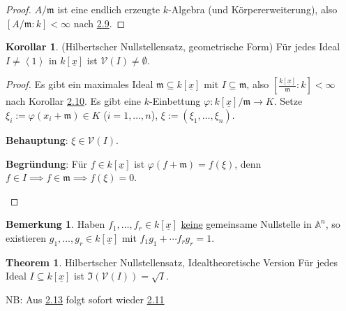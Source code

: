 \documentclass[
twoside=semi,
fontsize=12,
DIV=12, 
cleardoublepage=current,
leqno,
headings=optiontoheadandtoc, 
toc=idx
]{scrbook}
\newcommand{\A}{\mathbb{A}}
\newcommand{\V}{\mathcal{V}}
\newcommand{\x}{\underline{x}}
\newcommand{\I}{\mathfrak{I}}
\newcommand{\bracC}[1]{\left< #1 \right>}
\newcommand{\emphasize}[1]{\underline{#1}}
\theoremstyle{definition}
\newtheorem{bemerkung}[definition]{Bemerkung}
\newtheorem{korollar}[definition]{Korollar}
\newtheorem{theorem}[definition]{Theorem}
\begin{document}
	\begin{proof}\hfill\newline
		$A/\mathfrak{m}$ ist eine endlich erzeugte $k$-Algebra (und K\"orpererweiterung), also $[A/\mathfrak{m}:k] < \infty$ nach \hyperref[1.2.9]{2.9}.
	\end{proof}

	\begin{korollar}\label{1.2.11}(Hilbertscher Nullstellensatz, geometrische Form)\newline
		F\"ur jedes Ideal $I \neq \bracC{1}$ in $k[\x]$ ist $\V(I) \neq \emptyset$.
	\end{korollar}

	\begin{proof}\hfill\newline
		Es gibt ein maximales Ideal $\mathfrak{m} \subseteq k[\x]$ mit $I \subseteq \mathfrak{m}$, also $[\frac{k[\x]}{\mathfrak{m}}:k] < \infty$ nach Korollar \hyperref[1.2.10]{2.10}.
		Es gibt eine $k$-Einbettung $\varphi: k[\x]/\mathfrak{m} \to K$. Setze $\xi_i := \varphi(x_i+\mathfrak{m}) \in K$ ($i=1,\dots, n$), $\xi:= (\xi_1, \dots, \xi_n)$.
		\begin{tcolorbox}[colback=white,colframe=blue,arc=0cm]
			\textbf{Behauptung}: $\xi \in \V(I)$.
			
			\tcblower
			\textbf{Begr\"undung}: \newline
			F\"ur $f \in k[\x]$ ist $\varphi(f + \mathfrak{m}) = f(\xi)$, denn $f \in I \implies f \in \mathfrak{m} \implies f(\xi) = 0$.
		\end{tcolorbox}
	\end{proof}

	\begin{bemerkung}\label{1.2.12}\hfill\newline
		Haben $f_1, \dots, f_r \in k[\x]$ \emphasize{keine} gemeinsame Nullstelle in $\A^n$, so existieren $g_1, \dots, g_r \in k[\x]$ mit $f_1g_1+\cdots f_rg_r = 1$.
	\end{bemerkung}

	\begin{theorem}\label{1.2.13} Hilbertscher Nullstellensatz, Idealtheoretische Version\newline
		F\"ur jedes Ideal $I \subseteq k[\x]$ ist $\I(\V(I)) = \sqrt{I}$.
	\end{theorem}
	
	\noindent
	NB: Aus \hyperref[1.2.13]{2.13} folgt sofort wieder \hyperref[1.2.11]{2.11}
	
\end{document}
